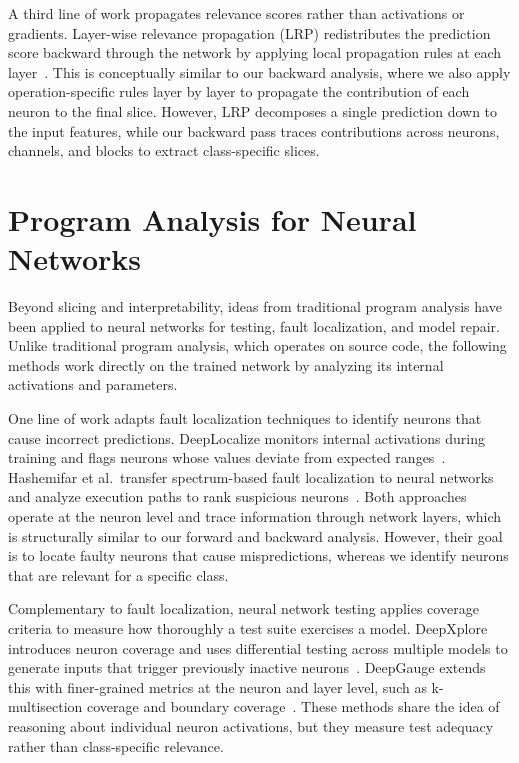 \documentclass[
12pt,
fancyheadings,
a4paper,
twoside,
BCOR=0.7cm,
nobcorignoretitle,
grayscalebody,
]{stsreprt}
\begin{document}
A third line of work propagates relevance scores rather than activations or gradients.
Layer-wise relevance propagation (LRP) redistributes the prediction score backward through the
network by applying local propagation rules at each layer~\cite{bach2015lrp}.
This is conceptually similar to our backward analysis, where we also apply operation-specific rules
layer by layer to propagate the contribution of each neuron to the final slice.
However, LRP decomposes a single prediction down to the input features, while our backward pass
traces contributions across neurons, channels, and blocks to extract class-specific slices.


\section{Program Analysis for Neural Networks}
\label{sec:rw-analysis}

Beyond slicing and interpretability, ideas from traditional program analysis have been applied to
neural networks for testing, fault localization, and model repair.
Unlike traditional program analysis, which operates on source code, the following methods work
directly on the trained network by analyzing its internal activations and parameters.

One line of work adapts fault localization techniques to identify neurons that cause incorrect
predictions.
DeepLocalize monitors internal activations during training and flags neurons whose values deviate
from expected ranges~\cite{wardat2021deeplocalize}.
Hashemifar et al.\ transfer spectrum-based fault localization to neural networks and analyze
execution paths to rank suspicious neurons~\cite{hashemifar2025path}.
Both approaches operate at the neuron level and trace information through network layers, which is
structurally similar to our forward and backward analysis.
However, their goal is to locate faulty neurons that cause mispredictions, whereas we identify
neurons that are relevant for a specific class.

Complementary to fault localization, neural network testing applies coverage criteria to measure
how thoroughly a test suite exercises a model.
DeepXplore introduces neuron coverage and uses differential testing across multiple models to
generate inputs that trigger previously inactive neurons~\cite{pei2017deepxplore}.
DeepGauge extends this with finer-grained metrics at the neuron and layer level, such as
k-multisection coverage and boundary coverage~\cite{ma2018deepgauge}.
These methods share the idea of reasoning about individual neuron activations, but they measure
test adequacy rather than class-specific relevance.
\end{document}
